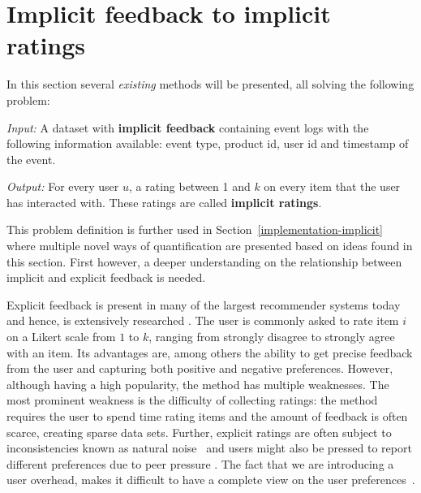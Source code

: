 
\clearpage

\label{implicit-feedback}
\section{Implicit feedback to implicit ratings}
\label{sec:implicit}

In this section several \textit{existing} methods will be presented, all
solving the following problem: 

\vspace{5 mm}

\noindent \textit{Input:} A dataset with \textbf{implicit feedback} containing event logs
with the following information available: event type, product id, user id and
timestamp of the event.

\vspace{3 mm}

\noindent \textit{Output:} For every user $u$, a rating between 1 and $k$ on every item that
the user has interacted with. These ratings are called \textbf{implicit
ratings}.

\vspace{5 mm}

This problem definition is further used in
Section~\ref{implementation-implicit} where multiple novel ways of
quantification are presented based on ideas found in this section. First
however, a deeper understanding on the relationship between implicit and
explicit feedback is needed.

Explicit feedback is present in many of the largest recommender systems today
and hence, is extensively researched \cite{Adomavicius2005}. The user is
commonly asked to rate item $i$ on a Likert scale from $1$ to $k$, ranging from
strongly disagree to strongly agree with an item. Its advantages are, among
others the ability to get precise feedback from the user and capturing both
positive and negative preferences. However, although having a high popularity,
the method has multiple weaknesses. The most prominent weakness is the
difficulty of collecting ratings: the method requires the user to spend time
rating items and the amount of feedback is often scarce, creating sparse data
sets. Further, explicit ratings are often subject to inconsistencies known as
natural noise~\cite{amatriain2009like} and users might also be pressed to
report different preferences due to peer pressure \cite{bell2007scalable}. The
fact that we are introducing a user overhead, makes it difficult to have a
complete view on the user preferences~\cite{Jawaheer2010}.

